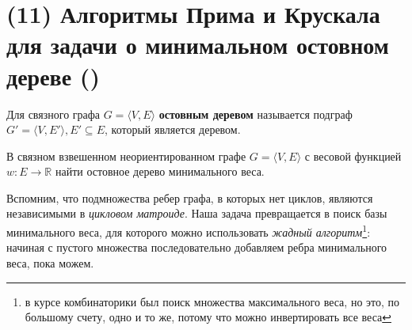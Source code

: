 \let\bf\bfseries
\let\it\itshape
\section{(11) Алгоритмы Прима и Крускала для задачи о минимальном остовном дереве (\groth)}
\begin{definition}
	Для связного графа $G=\langle V,E\rangle$ {\bf остовным деревом} называется подграф $G'=\langle V,E'\rangle,E'\subseteq E$, который является деревом.
\end{definition}
\begin{problem}
	В связном взвешенном неориентированном графе $G=\langle V,E\rangle$ с весовой функцией $w\colon E\to\mathbb{R}$ найти остовное дерево минимального веса.
\end{problem}
Вспомним, что подмножества ребер графа, в которых нет циклов, являются независимыми в {\it цикловом матроиде}. Наша задача превращается в поиск базы минимального веса, для которого можно использовать {\it жадный алгоритм}\footnote{в курсе комбинаторики был поиск множества максимального веса, но это, по большому счету, одно и то же, потому что можно инвертировать все веса}: начиная с пустого множества последовательно добавляем ребра минимального веса, пока можем.


